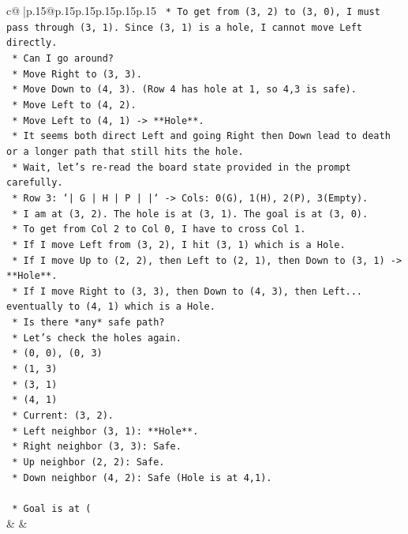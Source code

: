 \documentclass{article}
\begin{document}
{\begin{supertabular}{c@{$\;$}|p{.15\linewidth}@{}p{.15\linewidth}p{.15\linewidth}p{.15\linewidth}p{.15\linewidth}p{.15\linewidth}}
{{{\texttt{    *   To get from (3, 2) to (3, 0), I must pass through (3, 1). Since (3, 1) is a hole, I cannot move Left directly.} \\
\texttt{    *   Can I go around?} \\
\texttt{        *   Move Right to (3, 3).} \\
\texttt{        *   Move Down to (4, 3). (Row 4 has hole at 1, so 4,3 is safe).} \\
\texttt{        *   Move Left to (4, 2).} \\
\texttt{        *   Move Left to (4, 1) {-}> **Hole**.} \\
\texttt{    *   It seems both direct Left and going Right then Down lead to death or a longer path that still hits the hole.} \\
\texttt{    *   Wait, let's re{-}read the board state provided in the prompt carefully.} \\
\texttt{        *   Row 3: `| G | H | P | |` {-}> Cols: 0(G), 1(H), 2(P), 3(Empty).} \\
\texttt{    *   I am at (3, 2). The hole is at (3, 1). The goal is at (3, 0).} \\
\texttt{    *   To get from Col 2 to Col 0, I have to cross Col 1.} \\
\texttt{    *   If I move Left from (3, 2), I hit (3, 1) which is a Hole.} \\
\texttt{    *   If I move Up to (2, 2), then Left to (2, 1), then Down to (3, 1) {-}> **Hole**.} \\
\texttt{    *   If I move Right to (3, 3), then Down to (4, 3), then Left... eventually to (4, 1) which is a Hole.} \\
\texttt{    *   Is there *any* safe path?} \\
\texttt{    *   Let's check the holes again.} \\
\texttt{        *   (0, 0), (0, 3)} \\
\texttt{        *   (1, 3)} \\
\texttt{        *   (3, 1)} \\
\texttt{        *   (4, 1)} \\
\texttt{    *   Current: (3, 2).} \\
\texttt{    *   Left neighbor (3, 1): **Hole**.} \\
\texttt{    *   Right neighbor (3, 3): Safe.} \\
\texttt{    *   Up neighbor (2, 2): Safe.} \\
\texttt{    *   Down neighbor (4, 2): Safe (Hole is at 4,1).} \\
\\ 
\texttt{    *   Goal is at (} \\
            }
        }
    }
    & & \\ \\


\end{supertabular}}
\end{document}
